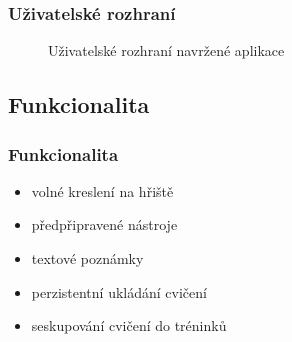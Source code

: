 \documentclass{beamer}
\begin{document}
\begin{frame}
  \frametitle{Uživatelské rozhraní}

  \begin{figure}[H]

    \centering
    \hfil

    \caption{Uživatelské rozhraní navržené aplikace}
    \label{pic:prototype_ui}
  \end{figure}
\end{frame}

\subsection{Funkcionalita}

\begin{frame}
  \frametitle{Funkcionalita}

  \begin{itemize}
    \item volné kreslení na hřiště
    \item předpřipravené nástroje
    \item textové poznámky
    \item perzistentní ukládání cvičení
    \item seskupování cvičení do tréninků
  \end{itemize}
\end{frame}
\end{document}
